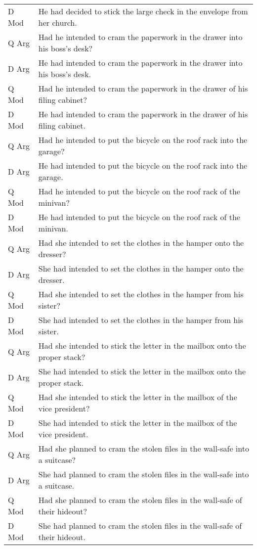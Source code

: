 \documentclass[11pt,oneside]{book}
\begin{document}
\begin{longtable}{ll}
D Mod & He had decided to stick the large check in the envelope from her church.\\
\addlinespace
Q Arg & Had he intended to cram the paperwork in the drawer into his boss's desk?\\
D Arg & He had intended to cram the paperwork in the drawer into his boss's desk.\\
Q Mod & Had he intended to cram the paperwork in the drawer of his filing cabinet?\\
D Mod & He had intended to cram the paperwork in the drawer of his filing cabinet.\\
\addlinespace
Q Arg & Had he intended to put the bicycle on the roof rack into the garage?\\
D Arg & He had intended to put the bicycle on the roof rack into the garage.\\
Q Mod & Had he intended to put the bicycle on the roof rack of the minivan?\\
D Mod & He had intended to put the bicycle on the roof rack of the minivan.\\
\addlinespace
Q Arg & Had she intended to set the clothes in the hamper onto the dresser?\\
D Arg & She had intended to set the clothes in the hamper onto the dresser.\\
Q Mod & Had she intended to set the clothes in the hamper from his sister?\\
D Mod & She had intended to set the clothes in the hamper from his sister.\\
\addlinespace
Q Arg & Had she intended to stick the letter in the mailbox onto the proper stack?\\
D Arg & She had intended to stick the letter in the mailbox onto the proper stack.\\
Q Mod & Had she intended to stick the letter in the mailbox of the vice president?\\
D Mod & She had intended to stick the letter in the mailbox of the vice president.\\
\addlinespace
Q Arg & Had she planned to cram the stolen files in the wall-safe into a suitcase?\\
D Arg & She had planned to cram the stolen files in the wall-safe into a suitcase.\\
Q Mod & Had she planned to cram the stolen files in the wall-safe of their hideout?\\
D Mod & She had planned to cram the stolen files in the wall-safe of their hideout.\\

\end{longtable}
\end{document}
